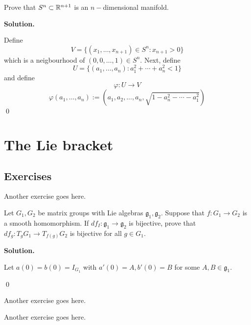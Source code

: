 \documentclass[12pt]{book}
\theoremstyle{definition}
\newenvironment{solution}
{%
  \par\noindent\textbf{Solution.}\quad
}
{%
  \qed\par
}
\begin{document}
\begin{taggedexercise}[WIP]
  Prove that $S^n \subset \mathbb{R}^{n+1}$ is an $n-$dimensional manifold.
\end{taggedexercise}
\begin{solution}
  Define 
  \[V = \{(x_1, \dots, x_{n+1}) \in S^n : x_{n+1} >0\}\]
  which is a neigbourhood of $(0, 0, \dots, 1) \in S^n$.
  Next, define
  \[U = \{(a_1, \dots, a_n) : a_1^2 + \cdots + a_n^2 < 1\}\]
  and define
  \[\varphi : U \to V\]
  \[\varphi(a_1, \dots, a_n) := (a_1, a_2, \dots , a_n, \sqrt{1 - a_n^2 - \cdots - a_1^2})\]
\end{solution}

\chapter{The Lie bracket}
\section{Exercises}

\begin{taggedexercise}[TODO]
Another exercise goes here.
\end{taggedexercise}

\begin{taggedexercise}[TODO]
  Let $G_1, G_2$ be matrix groups with Lie algebras $\mathfrak{g}_1, \mathfrak{g_2}$.
  Suppose that $f: G_1 \to G_2$ is a smooth homomorphism.
  If $df_I : \mathfrak{g}_1 \to \mathfrak{g}_2$ is bijective, prove that $df_g : T_gG_1 \to T_{f(g)}G_2$ is bijective for all $g \in G_1$.
\end{taggedexercise}

\begin{solution}
  Let $a(0) = b(0) = I_{G_1}$ with $a'(0) = A, b'(0) = B$ for some $A, B \in \mathfrak{g_1}$.
  
\end{solution}

\begin{taggedexercise}[TODO]
  Another exercise goes here.
\end{taggedexercise}

\begin{taggedexercise}[TODO]
  Another exercise goes here.
\end{taggedexercise}
\end{document}
